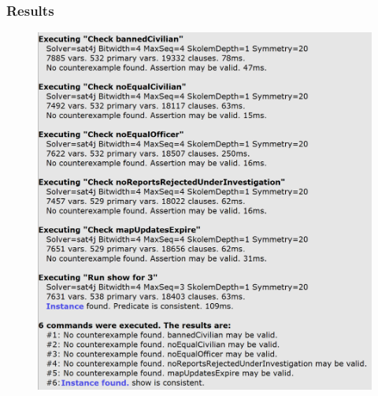 \documentclass[12pt,a4paper]{article}
\begin{document}
\subsubsection{Results}
\begin{figure}[H]
\begin{adjustwidth}{-25mm}{-25mm}
				\centering
				\includegraphics[width=.6\paperwidth,height=.6\paperheight, keepaspectratio]{Images/Alloy/results}
\end{adjustwidth}
\end{figure}
\newpage
\end{document}
